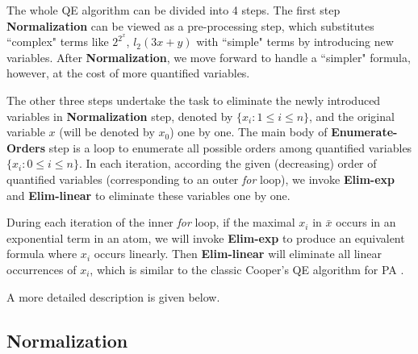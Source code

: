 {The whole QE algorithm can be divided into 4 steps. The first step \textbf{Normalization} can be viewed as a pre-processing step, which substitutes ``complex" terms like $2^{2^x}$, $l_2(3x+y)$ with ``simple" terms by introducing new variables. After \textbf{Normalization}, we move forward to handle a ``simpler" formula, however, at the cost of more quantified variables.

The other three steps undertake the task to eliminate the newly introduced variables in \textbf{Normalization} step, denoted by $\{x_i:1\le i\le n\}$, and the original variable $x$ (will be denoted by $x_0$) one by one. 
The main body of \textbf{Enumerate-Orders} step is a loop to enumerate all possible orders among quantified variables $\{x_i : 0\le i \le n\}$. 
In each iteration, according the given (decreasing) order of quantified variables (corresponding to an outer \emph{for} loop), we invoke \textbf{Elim-exp} and \textbf{Elim-linear} to eliminate these variables one by one. 

During each iteration of the inner \emph{for} loop, if the maximal $x_i$ in $\bar{x}$ occurs in an exponential term in an atom, we will invoke \textbf{Elim-exp} to produce an equivalent formula where $x_i$ occurs linearly. Then \textbf{Elim-linear} will eliminate all linear occurrences of $x_i$, which is similar to the classic Cooper's QE algorithm for PA \cite{Cooper72}. 

A more detailed description is given below.
}


\subsection{Normalization}


